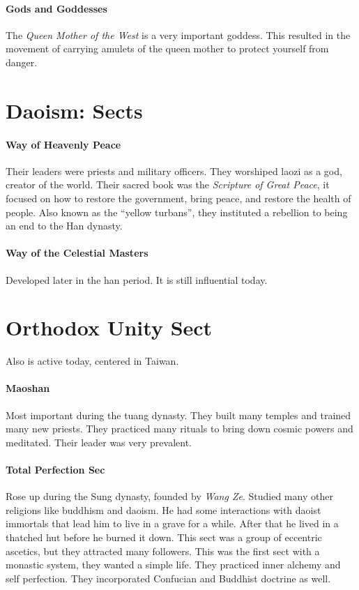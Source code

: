 \documentclass{article}
\begin{document}
\paragraph{Gods and Goddesses}
\label{par:gods_and_goddesses}
The \emph{Queen Mother of the West} is a very important goddess. This resulted in the movement of carrying amulets of the queen mother to protect yourself from danger.

\section*{Daoism: Sects}
\label{sec:daoism_sects}
\paragraph{Way of Heavenly Peace}
\label{par:way_of_heavenly_peace}
Their leaders were priests and military officers. They worshiped laozi as a god, creator of the world. Their sacred book was the \emph{Scripture of Great Peace}, it focused on how to restore the government, bring peace, and restore the health of people. Also known as the ``yellow turbans'', they instituted a rebellion to being an end to the Han dynasty.

\paragraph{Way of the Celestial Masters}
\label{par:way_of_the_celestial_masters}
Developed later in the han period. It is still influential today.

\section*{Orthodox Unity Sect}
\label{sec:orthodox_unity_sect}
Also is active today, centered in Taiwan.

\paragraph{Maoshan}
\label{par:maoshan}
Most important during the tuang dynasty. They built many temples and trained many new priests. They practiced many rituals to bring down cosmic powers and meditated. Their leader was very prevalent.

\paragraph{Total Perfection Sec}
\label{par:total_perfection_sec}
Rose up during the Sung dynasty, founded by \emph{Wang Ze}. Studied many other religions like buddhism and daoism. He had some interactions with daoist immortals that lead him to live in a grave for a while. After that he lived in a thatched hut before he burned it down. This sect was a group of eccentric ascetics, but they attracted many followers. This was the first sect with a monastic system, they wanted a simple life. They practiced inner alchemy and self perfection. They incorporated Confucian and Buddhist doctrine as well.
\end{document}
